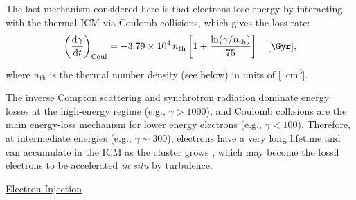 \documentclass[modern]{aastex62}
\newcommand{\R}[1]{\mathrm{#1}}
\newcommand{\D}[1]{\R{d} #1}
\newcommand{\diff}[2]{\frac{\D{#1}}{\D{#2}}}
\begin{document}
The last mechanism considered here is that electrons lose energy
by interacting with the thermal ICM via Coulomb collisions, which gives
the loss rate:
\begin{equation}
  \label{eq:eloss-coul}
  \left( \diff{\gamma}{t} \right)_{\R{Coul}} =
  \num{-3.79e4} \,n_{\R{th}} \left[ 1 +
    \frac{\ln(\gamma/n_{\R{th}})}{75} \right] \quad [\si{\per\Gyr}],
\end{equation}
where $n_{\R{th}}$ is the thermal number density (see below)
in units of [\si{\per\cm\cubed}].

The inverse Compton scattering and synchrotron radiation dominate
energy losses at the high-energy regime (e.g., $\gamma > 1000$),
and Coulomb collisions are the main energy-loss mechanism for lower
energy electrons (e.g., $\gamma < 100$).
Therefore, at intermediate energies (e.g., $\gamma \sim 300$),
electrons have a very long lifetime and can accumulate in the ICM
as the cluster grows \citep{sarazin1999}, which may become the fossil
electrons to be accelerated \emph{in situ} by turbulence.

\vspace{1ex}
\uline{Electron Injection}
\end{document}
